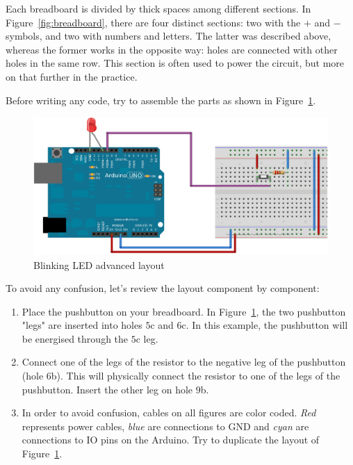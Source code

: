 Each breadboard is divided by thick spaces among different sections. In Figure~\ref{fig:breadboard}, there are four distinct sections: two with the $+$ and $-$ symbols, and two with numbers and letters. The latter was described above, whereas the former works in the opposite way: holes are connected with other holes in the same row. This section is often used to power the circuit, but more on that further in the practice.

Before writing any code, try to assemble the parts as shown in Figure~\ref{fig:blinkingLEDAdvancedLayout}.

\begin{figure}[htbp]
  \centering
  \includegraphics[width=0.9\linewidth]{figures/blinkingLEDAdvanced-NEW.eps}
  \caption{Blinking LED advanced layout
  \label{fig:blinkingLEDAdvancedLayout}}
\end{figure}

To avoid any confusion, let's review the layout component by component:

\begin{enumerate}
	\item Place the pushbutton on your breadboard. In Figure~\ref{fig:blinkingLEDAdvancedLayout}, the two pushbutton "legs" are inserted into holes $5$c and $6$c. In this example, the pushbutton will be energised through the $5$c leg.
	\item Connect one of the legs of the resistor to the negative leg of the pushbutton (hole $6$b). This will physically connect the resistor to one of the legs of the pushbutton. Insert the other leg on hole $9$b.
	\item In order to avoid confusion, cables on all figures are color coded. \emph{Red} represents power cables, \emph{blue} are connections to GND and \emph{cyan} are connections to IO pins on the Arduino. Try to duplicate the layout of Figure~\ref{fig:blinkingLEDAdvancedLayout}.
\end{enumerate}

